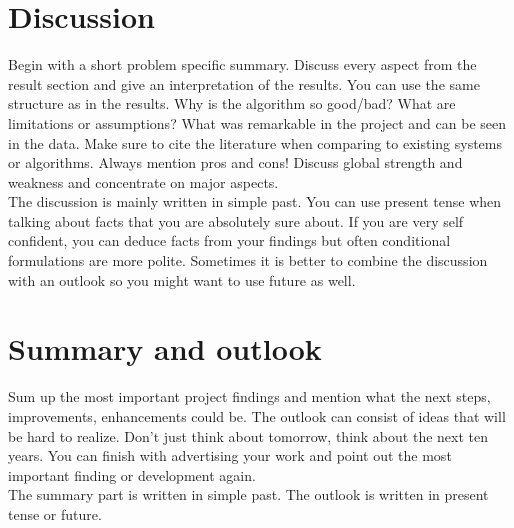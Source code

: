 
\section{Discussion}
Begin with a short problem specific summary. Discuss every aspect from the result section and give an interpretation of the results. You can use the same structure as in the results. Why is the algorithm so good/bad? What are limitations or assumptions? What was remarkable in the project and can be seen in the data. Make sure to cite the literature when comparing to existing systems or algorithms. Always mention pros and cons! Discuss global strength and weakness and concentrate on major aspects.\\
The discussion is mainly written in simple past. You can use present tense when talking about facts that you are absolutely sure about. If you are very self confident, you can deduce facts from your findings but often conditional formulations are more polite. Sometimes it is better to combine the discussion with an outlook so you might want to use future as well. 

\section{Summary and outlook}
Sum up the most important project findings and mention what the next steps, improvements, enhancements could be. The outlook can consist of ideas that will be hard to realize. Don't just think about tomorrow, think about the next ten years. You can finish with advertising your work and point out the most important finding or development again.\\
The summary part is written in simple past. The outlook is written in present tense or future.
